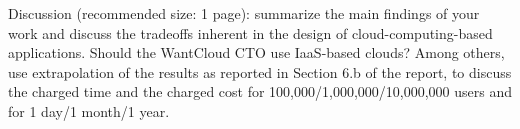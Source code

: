 Discussion (recommended size: 1 page): summarize the main findings of your work and discuss the tradeoffs inherent in the design of cloud-computing-based applications.
Should the WantCloud CTO use IaaS-based clouds?
Among others, use extrapolation of the results as reported in Section 6.b of the report, to discuss the charged time and the charged cost for 100,000/1,000,000/10,000,000 users and for 1 day/1 month/1 year.
